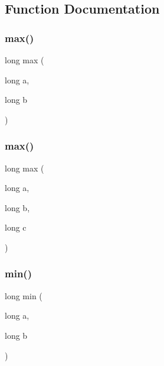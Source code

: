 \subsection{Function Documentation}
\mbox{\label{adat-devel_2lib_2SU3_2misc_8cc_a9881a990a03d466ac29ae1fb645fe1a4}} 
\subsubsection{\texorpdfstring{max()}{max()}\hspace{0.1cm}{\footnotesize\ttfamily [1/2]}}
{\footnotesize\ttfamily long max (\begin{DoxyParamCaption}\item[{long}]{a,  }\item[{long}]{b }\end{DoxyParamCaption})}

\mbox{\label{adat-devel_2lib_2SU3_2misc_8cc_a6e0243083ac83960d744961a5aa26f8d}} 
\subsubsection{\texorpdfstring{max()}{max()}\hspace{0.1cm}{\footnotesize\ttfamily [2/2]}}
{\footnotesize\ttfamily long max (\begin{DoxyParamCaption}\item[{long}]{a,  }\item[{long}]{b,  }\item[{long}]{c }\end{DoxyParamCaption})}

\mbox{\label{adat-devel_2lib_2SU3_2misc_8cc_a04a42f8bdb11b05ec4a03a191b426081}} 
\subsubsection{\texorpdfstring{min()}{min()}\hspace{0.1cm}{\footnotesize\ttfamily [1/3]}}
{\footnotesize\ttfamily long min (\begin{DoxyParamCaption}\item[{long}]{a,  }\item[{long}]{b }\end{DoxyParamCaption})}

